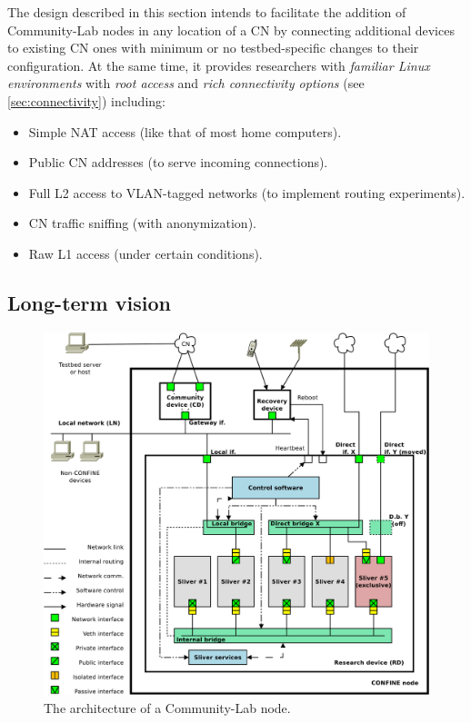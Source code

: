\documentclass[conference]{IEEEtran}
\begin{document}
The design described in this section intends to facilitate the addition of
Community-Lab nodes in any location of a CN by connecting additional devices to
existing CN ones with minimum or no testbed-specific changes to their
configuration.  At the same time, it provides researchers with \emph{familiar
  Linux environments} with \emph{root access} and \emph{rich connectivity
  options} (see \ref{sec:connectivity}) including:

\begin{itemize}
\item Simple NAT access (like that of most home computers).
\item Public CN addresses (to serve incoming connections).
\item Full L2 access to VLAN-tagged networks (to implement routing
  experiments).
\item CN traffic sniffing (with anonymization).
\item Raw L1 access (under certain conditions).
\end{itemize}

\subsection{Long-term vision}

\begin{figure}[!t]
\centering
\includegraphics[width=\linewidth]{node-arch}
\caption{The architecture of a Community-Lab node.}
\label{fig:node-arch}
\end{figure}
\end{document}
